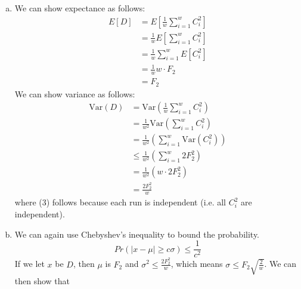 \documentclass{article}
\theoremstyle{casestyle}
\begin{document}
\begin{enumerate}[a)]
\item We can show expectance as follows:
\begin{align*}
  E[D] &= E\left[\frac{1}{w}\sum_{i=1}^wC_i^2\right] \\ 
       &= \frac{1}{w}E\left[\sum_{i=1}^wC_i^2\right] \\ 
       &= \frac{1}{w}\sum_{i=1}^wE\left[C_i^2\right] \\ 
       &= \frac{1}{w}w\cdot F_2 \\
       &= F_2
\end{align*} We can show variance as follows:
\begin{align}
  \mathrm{Var}(D) &= \mathrm{Var}\left(\frac{1}{w}\sum_{i=1}^wC_i^2\right) \\
                  &= \frac{1}{w^2}\mathrm{Var}\left(\sum_{i=1}^wC_i^2\right) \\
                  &= \frac{1}{w^2}\left(\sum_{i=1}^w\mathrm{Var}(C_i^2)\right) \\
                  &\leq \frac{1}{w^2}\left(\sum_{i=1}^w2F_2^2\right) \\
                  &= \frac{1}{w^2}\left(w\cdot2F_2^2\right) \\
                  &= \frac{2F_2^2}{w}
\end{align} where (3) follows because each run is independent (i.e. all $C_i^2$ are independent).
\item We can again use Chebyshev's inequality to bound the probability.
\[
  Pr \left(\left|x-\mu\right| \geq c\sigma \right) \leq \frac{1}{c^2}
\] If we let $x$ be $D$, then $\mu$ is $F_2$ and $\sigma^2\leq \frac{2F_2^2}{w}$, which means $\sigma \leq F_2\sqrt{\frac{2}{w}}$. We can then show that


\end{enumerate}
\end{document}
